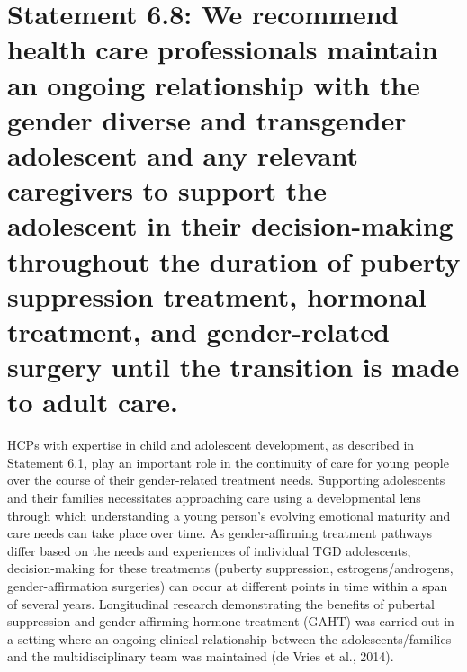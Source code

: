 \documentclass[
]{book}
\begin{document}
\hypertarget{statement-6.8-we-recommend-health-care-professionals-maintain-an-ongoing-relationship-with-the-gender-diverse-and-transgender-adolescent-and-any-relevant-caregivers-to-support-the-adolescent-in-their-decision-making-throughout-the-duration-of-puberty-suppression-treatment-hormonal-treatment-and-gender-related-surgery-until-the-transition-is-made-to-adult-care.}{%
\section*{Statement 6.8: We recommend health care professionals maintain an ongoing relationship with the gender diverse and transgender adolescent and any relevant caregivers to support the adolescent in their decision-making throughout the duration of puberty suppression treatment, hormonal treatment, and gender-related surgery until the transition is made to adult care.}\label{statement-6.8-we-recommend-health-care-professionals-maintain-an-ongoing-relationship-with-the-gender-diverse-and-transgender-adolescent-and-any-relevant-caregivers-to-support-the-adolescent-in-their-decision-making-throughout-the-duration-of-puberty-suppression-treatment-hormonal-treatment-and-gender-related-surgery-until-the-transition-is-made-to-adult-care.}}

HCPs with expertise in child and adolescent
development, as described in Statement 6.1, play
an important role in the continuity of care for
young people over the course of their
gender-related treatment needs. Supporting adolescents and their families necessitates approaching care using a developmental lens through
which understanding a young person's evolving
emotional maturity and care needs can take place
over time. As gender-affirming treatment pathways differ based on the needs and experiences
of individual TGD adolescents, decision-making
for these treatments (puberty suppression, estrogens/androgens, gender-affirmation surgeries) can
occur at different points in time within a span
of several years. Longitudinal research demonstrating the benefits of pubertal suppression and
gender-affirming hormone treatment (GAHT)
was carried out in a setting where an ongoing
clinical relationship between the adolescents/families and the multidisciplinary team was maintained (de Vries et al., 2014).
\end{document}
